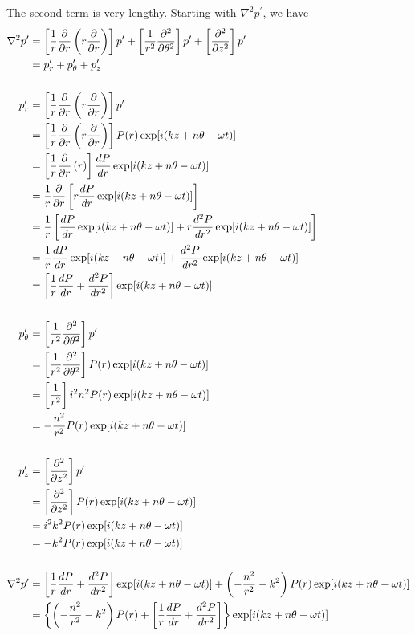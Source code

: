 \documentclass[onecolumn,10pt]{jhwhw}
\begin{document}
The second term is very lengthy. Starting with $\nabla^2 p^{\prime}$, we have
\begin{align*}
\nabla^2 p^{\prime} &= \left [ \dfrac{1}{r} \dfrac{\partial}{\partial r} \left ( r \dfrac{\partial} {\partial r} \right ) \right ] p^{\prime}
+ \left [ \dfrac{1}{r^2} \dfrac{\partial ^2}{\partial \theta^2} \right ] p^{\prime}
+ \left [ \dfrac{\partial ^2}{\partial z^2} \right ] p^{\prime} \\
&= p^{\prime}_r + p^{\prime}_{\theta} + p^{\prime}_z \\
\\
p^{\prime}_r  &= \left [ \dfrac{1}{r} \dfrac{\partial}{\partial r} \left ( r \dfrac{\partial} {\partial r} \right ) \right ] p^{\prime} \\
&= \left [ \dfrac{1}{r} \dfrac{\partial}{\partial r} \left ( r \dfrac{\partial} {\partial r} \right ) \right ] P(r) \exp[i(kz+n \theta - \omega t)] \\
&= \left [ \dfrac{1}{r} \dfrac{\partial}{\partial r} \left ( r \right ) \right ] \dfrac{d P} {d r} \exp[i(kz+n \theta - \omega t)] \\
&= \dfrac{1}{r} \dfrac{\partial}{\partial r} \left [ r \dfrac{d P} {d r} \exp[i(kz+n \theta - \omega t)]  \right ] \\
&= \dfrac{1}{r} \left [ \dfrac{d P} {d r} \exp[i(kz+n \theta - \omega t)] + r \dfrac{d^2 P} {d r^2} \exp[i(kz+n \theta - \omega t)]  \right ] \\
&= \dfrac{1}{r} \dfrac{d P} {d r} \exp[i(kz+n \theta - \omega t)] + \dfrac{d^2 P} {d r^2} \exp[i(kz+n \theta - \omega t)] \\
&= \left [ \dfrac{1}{r} \dfrac{d P} {d r} + \dfrac{d^2 P} {d r^2} \right ] \exp[i(kz+n \theta - \omega t)] \\
\\
p^{\prime}_{\theta} &= \left [ \dfrac{1}{r^2} \dfrac{\partial ^2}{\partial \theta^2} \right ] p^{\prime} \\
&= \left [ \dfrac{1}{r^2} \dfrac{\partial ^2}{\partial \theta^2} \right ] P(r) \exp[i(kz+n \theta - \omega t)] \\
&= \left [ \dfrac{1}{r^2} \right ] i^2 n^2 P(r) \exp[i(kz+n \theta - \omega t)] \\
&= - \dfrac{n^2}{r^2}  P(r) \exp[i(kz+n \theta - \omega t)] \\
\\
p^{\prime}_z &= \left [ \dfrac{\partial ^2}{\partial z^2} \right ] p^{\prime} \\
&= \left [ \dfrac{\partial ^2}{\partial z^2} \right ] P(r) \exp[i(kz+n \theta - \omega t)] \\
&= i^2k^2 P(r) \exp[i(kz+n \theta - \omega t)] \\
&= -k^2 P(r) \exp[i(kz+n \theta - \omega t)] \\
\\
\nabla^2 p^{\prime} &= \left [ \dfrac{1}{r} \dfrac{d P} {d r} + \dfrac{d^2 P} {d r^2} \right ] \exp[i(kz+n \theta - \omega t)] + \left ( -\dfrac{n^2}{r^2} -k^2 \right ) P(r) \exp[i(kz+n \theta - \omega t)] \\
&= \left \{ \left ( -\dfrac{n^2}{r^2} -k^2 \right ) P(r) + \left [ \dfrac{1}{r} \dfrac{d P} {d r} + \dfrac{d^2 P} {d r^2} \right ] \right \} \exp[i(kz+n \theta - \omega t)]
\end{align*}
\end{document}
